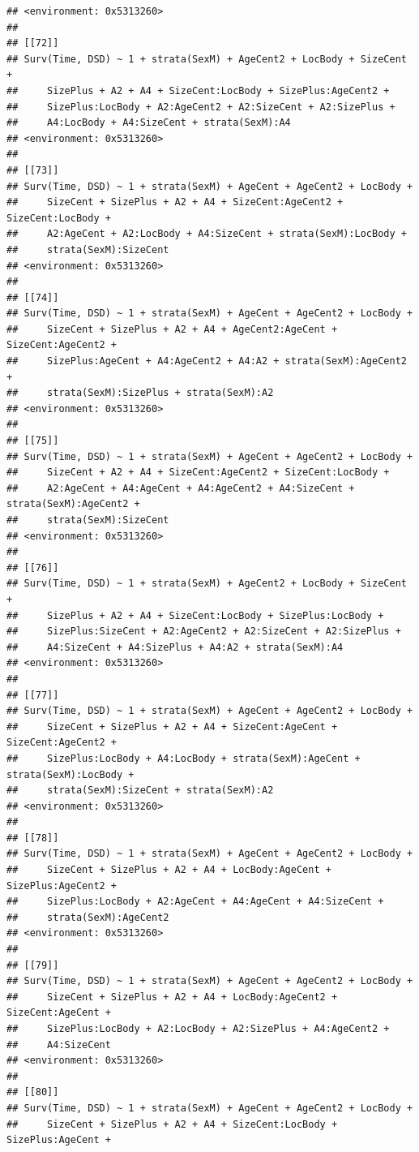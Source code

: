 \documentclass{article}\usepackage[]{graphicx}\usepackage[]{color}
\makeatletter
\newenvironment{kframe}{%
 \def\at@end@of@kframe{}%
 \ifinner\ifhmode%
  \def\at@end@of@kframe{\end{minipage}}%
  \begin{minipage}{\columnwidth}%
 \fi\fi%
 \def\FrameCommand##1{\hskip\@totalleftmargin \hskip-\fboxsep
 \colorbox{shadecolor}{##1}\hskip-\fboxsep
     \hskip-\linewidth \hskip-\@totalleftmargin \hskip\columnwidth}%
 \MakeFramed {\advance\hsize-\width
   \@totalleftmargin\z@ \linewidth\hsize
   \@setminipage}}%
 {\par\unskip\endMakeFramed%
 \at@end@of@kframe}
\newenvironment{knitrout}{}{} %
\makeatother
\begin{document}
\begin{knitrout}
\begin{kframe}
\begin{verbatim}
## <environment: 0x5313260>
## 
## [[72]]
## Surv(Time, DSD) ~ 1 + strata(SexM) + AgeCent2 + LocBody + SizeCent + 
##     SizePlus + A2 + A4 + SizeCent:LocBody + SizePlus:AgeCent2 + 
##     SizePlus:LocBody + A2:AgeCent2 + A2:SizeCent + A2:SizePlus + 
##     A4:LocBody + A4:SizeCent + strata(SexM):A4
## <environment: 0x5313260>
## 
## [[73]]
## Surv(Time, DSD) ~ 1 + strata(SexM) + AgeCent + AgeCent2 + LocBody + 
##     SizeCent + SizePlus + A2 + A4 + SizeCent:AgeCent2 + SizeCent:LocBody + 
##     A2:AgeCent + A2:LocBody + A4:SizeCent + strata(SexM):LocBody + 
##     strata(SexM):SizeCent
## <environment: 0x5313260>
## 
## [[74]]
## Surv(Time, DSD) ~ 1 + strata(SexM) + AgeCent + AgeCent2 + LocBody + 
##     SizeCent + SizePlus + A2 + A4 + AgeCent2:AgeCent + SizeCent:AgeCent2 + 
##     SizePlus:AgeCent + A4:AgeCent2 + A4:A2 + strata(SexM):AgeCent2 + 
##     strata(SexM):SizePlus + strata(SexM):A2
## <environment: 0x5313260>
## 
## [[75]]
## Surv(Time, DSD) ~ 1 + strata(SexM) + AgeCent + AgeCent2 + LocBody + 
##     SizeCent + A2 + A4 + SizeCent:AgeCent2 + SizeCent:LocBody + 
##     A2:AgeCent + A4:AgeCent + A4:AgeCent2 + A4:SizeCent + strata(SexM):AgeCent2 + 
##     strata(SexM):SizeCent
## <environment: 0x5313260>
## 
## [[76]]
## Surv(Time, DSD) ~ 1 + strata(SexM) + AgeCent2 + LocBody + SizeCent + 
##     SizePlus + A2 + A4 + SizeCent:LocBody + SizePlus:LocBody + 
##     SizePlus:SizeCent + A2:AgeCent2 + A2:SizeCent + A2:SizePlus + 
##     A4:SizeCent + A4:SizePlus + A4:A2 + strata(SexM):A4
## <environment: 0x5313260>
## 
## [[77]]
## Surv(Time, DSD) ~ 1 + strata(SexM) + AgeCent + AgeCent2 + LocBody + 
##     SizeCent + SizePlus + A2 + A4 + SizeCent:AgeCent + SizeCent:AgeCent2 + 
##     SizePlus:LocBody + A4:LocBody + strata(SexM):AgeCent + strata(SexM):LocBody + 
##     strata(SexM):SizeCent + strata(SexM):A2
## <environment: 0x5313260>
## 
## [[78]]
## Surv(Time, DSD) ~ 1 + strata(SexM) + AgeCent + AgeCent2 + LocBody + 
##     SizeCent + SizePlus + A2 + A4 + LocBody:AgeCent + SizePlus:AgeCent2 + 
##     SizePlus:LocBody + A2:AgeCent + A4:AgeCent + A4:SizeCent + 
##     strata(SexM):AgeCent2
## <environment: 0x5313260>
## 
## [[79]]
## Surv(Time, DSD) ~ 1 + strata(SexM) + AgeCent + AgeCent2 + LocBody + 
##     SizeCent + SizePlus + A2 + A4 + LocBody:AgeCent2 + SizeCent:AgeCent + 
##     SizePlus:LocBody + A2:LocBody + A2:SizePlus + A4:AgeCent2 + 
##     A4:SizeCent
## <environment: 0x5313260>
## 
## [[80]]
## Surv(Time, DSD) ~ 1 + strata(SexM) + AgeCent + AgeCent2 + LocBody + 
##     SizeCent + SizePlus + A2 + A4 + SizeCent:LocBody + SizePlus:AgeCent + 

\end{verbatim}
\end{kframe}
\end{knitrout}
\end{document}
